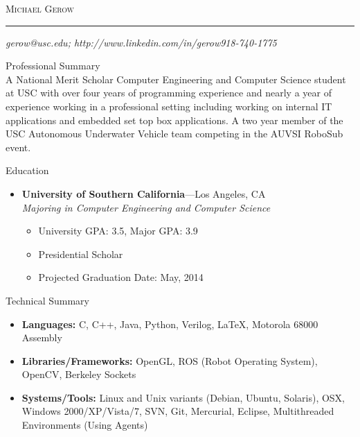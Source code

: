 \documentclass[10pt,oneside]{article}
\makeatletter
\newcommand{\name}{Michael Gerow}
\newcommand{\phone}{918-740-1775}
\newcommand{\email}{gerow@usc.edu}
\newcommand{\linkedin}{http://www.linkedin.com/in/gerow}
\newcommand{\bigname}[1]{
	\begin{center}\fontfamily{phv}\selectfont\Large\scshape#1\end{center}
}
\newenvironment{ressection}[1]{
	\vspace{4pt}
	{\fontfamily{phv}\selectfont\Large#1}
	\begin{itemize}
	\vspace{3pt}
}{
	\end{itemize}
}
\newcommand{\resplainsection}[1]{
	{\fontfamily{phv}\selectfont\Large#1}
	\vspace{-12pt}
	\\

}
\newcommand{\resitem}[1]{
	\vspace{-4pt}
	\item \begin{flushleft} #1 \end{flushleft}
}
\newcommand{\ressubitem}[1]{
	\vspace{-1pt}
	\item \begin{flushleft} #1 \end{flushleft}
}
\newcommand{\resbigitem}[3]{
	\vspace{-5pt}
	\item
	\textbf{#1}---#2 \\
	\textit{#3}
}
\newenvironment{ressubsec}[3]{
	\resbigitem{#1}{#2}{#3}
	\vspace{-2pt}
	\begin{itemize}
}{
	\end{itemize}
}
\makeatother
\begin{document}
 \selectfont

\bigname{\name}

\vspace{-8pt} \rule{\textwidth}{1pt}

\vspace{-1pt} {\small\itshape \email; \linkedin \hfill \phone}

\vspace{8 pt}


\resplainsection{Professional Summary}
	A National Merit Scholar Computer Engineering and Computer Science student at USC with over four years of programming experience and nearly a year of experience working in a professional setting including working on internal IT applications and embedded set top box applications.  A two year member of the USC Autonomous Underwater Vehicle team competing in the AUVSI RoboSub event.

\begin{ressection}{Education}

	\begin{ressubsec}{University of Southern California}{Los Angeles, CA}{Majoring in Computer Engineering and Computer Science}
		\ressubitem{University GPA:  3.5, Major GPA: 3.9}
		\ressubitem{Presidential Scholar}
		\ressubitem{Projected Graduation Date:  May, 2014}
	\end{ressubsec}

\end{ressection}

\begin{ressection}{Technical Summary}

	\resitem{\textbf{Languages:} C, C++, Java, Python, Verilog, \LaTeX, Motorola 68000 Assembly }
	\resitem{\textbf{Libraries/Frameworks:} OpenGL, ROS (Robot Operating System), OpenCV, Berkeley Sockets }
	\resitem{\textbf{Systems/Tools:} Linux and Unix variants (Debian, Ubuntu, Solaris), OSX, Windows 2000/XP/Vista/7, SVN, Git, Mercurial, Eclipse, Multithreaded Environments (Using Agents)}
	
\end{ressection}


\end{document}
